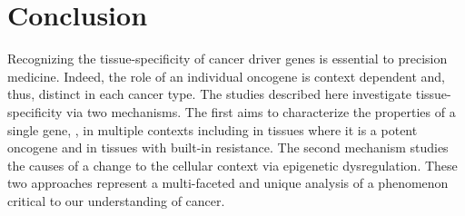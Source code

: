 \chapter{Conclusion}

Recognizing the tissue-specificity of cancer driver genes is essential to precision medicine.
Indeed, the role of an individual oncogene is context dependent and, thus, distinct in each cancer type.
The studies described here investigate tissue-specificity via two mechanisms.
The first aims to characterize the properties of a single gene, \KRAS{}, in multiple contexts including in tissues where it is a potent oncogene and in tissues with built-in resistance.
The second mechanism studies the causes of a change to the cellular context via epigenetic dysregulation.
These two approaches represent a multi-faceted and unique analysis of a phenomenon critical to our understanding of cancer.
